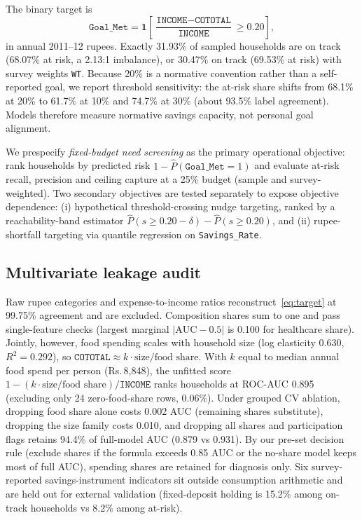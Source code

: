 \documentclass[conference]{IEEEtran}
\newcommand{\rs}{Rs.\,}
\begin{document}
The binary target is
\begin{equation}
    \texttt{Goal\_Met} = \mathbf{1}\left[\frac{\texttt{INCOME} - \texttt{COTOTAL}}{\texttt{INCOME}} \geq 0.20\right],
    \label{eq:target}
\end{equation}
in annual 2011--12 rupees. Exactly 31.93\% of sampled households are on track (68.07\% at risk, a 2.13:1 imbalance), or 30.47\% on track (69.53\% at risk) with survey weights \texttt{WT}. Because 20\% is a normative convention rather than a self-reported goal, we report threshold sensitivity: the at-risk share shifts from 68.1\% at 20\% to 61.7\% at 10\% and 74.7\% at 30\% (about 93.5\% label agreement). Models therefore measure normative savings capacity, not personal goal alignment.

We prespecify \emph{fixed-budget need screening} as the primary operational objective: rank households by predicted risk $1 - \hat{P}(\texttt{Goal\_Met}=1)$ and evaluate at-risk recall, precision and ceiling capture at a 25\% budget (sample and survey-weighted). Two secondary objectives are tested separately to expose objective dependence: (i) hypothetical threshold-crossing nudge targeting, ranked by a reachability-band estimator $\hat{P}(s \ge 0.20-\delta) - \hat{P}(s \ge 0.20)$, and (ii) rupee-shortfall targeting via quantile regression on \texttt{Savings\_Rate}.

\subsection{Multivariate leakage audit}

Raw rupee categories and expense-to-income ratios reconstruct~\eqref{eq:target} at 99.75\% agreement and are excluded. Composition shares sum to one and pass single-feature checks (largest marginal $| \text{AUC} - 0.5 |$ is 0.100 for healthcare share). Jointly, however, food spending scales with household size (log elasticity 0.630, $R^2 = 0.292$), so $\texttt{COTOTAL} \approx k \cdot \text{size} / \text{food share}$. With $k$ equal to median annual food spend per person (\rs 8,848), the unfitted score $1 - (k \cdot \text{size} / \text{food share}) / \texttt{INCOME}$ ranks households at ROC-AUC 0.895 (excluding only 24 zero-food-share rows, 0.06\%). Under grouped CV ablation, dropping food share alone costs 0.002 AUC (remaining shares substitute), dropping the size family costs 0.010, and dropping all shares and participation flags retains 94.4\% of full-model AUC (0.879 vs 0.931). By our pre-set decision rule (exclude shares if the formula exceeds 0.85 AUC or the no-share model keeps most of full AUC), spending shares are retained for diagnosis only. Six survey-reported savings-instrument indicators sit outside consumption arithmetic and are held out for external validation (fixed-deposit holding is 15.2\% among on-track households vs 8.2\% among at-risk).
\end{document}

